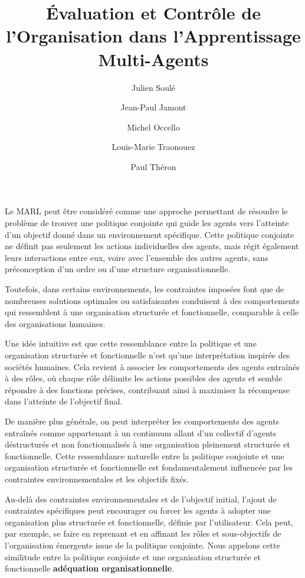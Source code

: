 \documentclass[sigconf,anonymous]{aamas}
\title[AAMAS-2025 CybMASDE]{Évaluation et Contrôle de l'Organisation dans l'Apprentissage Multi-Agents}
\author{Julien Soulé}
\affiliation{
  \institution{Univ. Grenoble Alpes}
  \city{Valence}
  \country{France}}
\author{Jean-Paul Jamont}
\affiliation{
  \institution{Univ. Grenoble Alpes}
  \city{Valence}
  \country{France}}
\author{Michel Occello}
\affiliation{
  \institution{Univ. Grenoble Alpes}
  \city{Valence}
  \country{France}}
\author{Louis-Marie Traonouez}
\affiliation{
  \institution{Thales Land and Air Systems, BU IAS}
  \city{Rennes}
  \country{France}}
\author{Paul Théron}
\affiliation{
  \institution{AICA IWG}
  \city{La Guillermie}
  \country{France}}
\begin{document}

\pagestyle{fancy}
\fancyhead{}


\maketitle



Le MARL peut être considéré comme une approche permettant de résoudre le problème de trouver une politique conjointe qui guide les agents vers l'atteinte d'un objectif donné dans un environnement spécifique.
Cette politique conjointe ne définit pas seulement les actions individuelles des agents, mais régit également leurs interactions entre eux, voire avec l'ensemble des autres agents, sans préconception d'un ordre ou d'une structure organisationnelle.

Toutefois, dans certains environnements, les contraintes imposées font que de nombreuses solutions optimales ou satisfaisantes conduisent à des comportements qui ressemblent à une organisation structurée et fonctionnelle, comparable à celle des organisations humaines.

Une idée intuitive est que cette ressemblance entre la politique et une organisation structurée et fonctionnelle n'est qu'une interprétation inspirée des sociétés humaines. Cela revient à associer les comportements des agents entraînés à des rôles, où chaque rôle délimite les actions possibles des agents et semble répondre à des fonctions précises, contribuant ainsi à maximiser la récompense dans l'atteinte de l'objectif final.

De manière plus générale, on peut interpréter les comportements des agents entraînés comme appartenant à un continuum allant d'un collectif d'agents déstructurés et non fonctionnalisés à une organisation pleinement structurée et fonctionnelle. Cette ressemblance naturelle entre la politique conjointe et une organisation structurée et fonctionnelle est fondamentalement influencée par les contraintes environnementales et les objectifs fixés.

Au-delà des contraintes environnementales et de l'objectif initial, l'ajout de contraintes spécifiques peut encourager ou forcer les agents à adopter une organisation plus structurée et fonctionnelle, définie par l'utilisateur. Cela peut, par exemple, se faire en reprenant et en affinant les rôles et sous-objectifs de l'organisation émergente issue de la politique conjointe.
Nous appelons cette similitude entre la politique conjointe et une organisation structurée et fonctionnelle \textbf{adéquation organisationnelle}.
\end{document}
